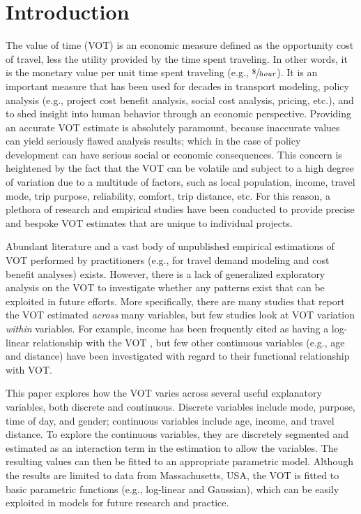 \documentclass[numbered]{trbunofficial}\usepackage[]{graphicx}\usepackage[]{color}
\begin{document}
\section{Introduction}
The value of time (VOT) is an economic measure defined as the opportunity cost of travel, less the utility provided by the time spent traveling. In other words, it is the monetary value per unit time spent traveling (e.g., $\sfrac{\$}{hour}$). It is an important measure that has been used for decades in transport modeling, policy analysis (e.g., project cost benefit analysis, social cost analysis, pricing, etc.), and to shed insight into human behavior through an economic perspective. Providing an accurate VOT estimate is absolutely paramount, because inaccurate values can yield seriously flawed analysis results; which in the case of policy development can have serious social or economic consequences. This concern is heightened by the fact that the VOT can be volatile and subject to a high degree of variation due to a multitude of factors, such as local population, income, travel mode, trip purpose, reliability, comfort, trip distance, etc. For this reason, a plethora of research and empirical studies have been conducted to provide precise and bespoke VOT estimates that are unique to individual projects. 

Abundant literature and a vast body of unpublished empirical estimations of VOT performed by practitioners (e.g., for travel demand modeling and cost benefit analyses) exists. However, there is a lack of generalized exploratory analysis on the VOT to investigate whether any patterns exist that can be exploited in future efforts. More specifically, there are many studies that report the VOT estimated \emph{across} many variables, but few studies look at VOT variation \emph{within} variables. For example, income has been frequently cited as having a log-linear relationship with the VOT \citep{Athira2016,Borjesson2012,Steimetz2005,Kouwenhoven2014}, but few other continuous variables (e.g., age and distance) have been investigated with regard to their functional relationship with VOT.

This paper explores how the VOT varies across several useful explanatory variables, both discrete and continuous. Discrete variables include mode, purpose, time of day, and gender; continuous variables include age, income, and travel distance. To explore the continuous variables, they are discretely segmented and estimated as an interaction term in the estimation to allow the variables. The resulting values can then be fitted to an appropriate parametric model. Although the results are limited to data from Massachusetts, USA, the VOT is fitted to basic parametric functions (e.g., log-linear and Gaussian), which can be easily exploited in models for future research and practice. 
\end{document}

